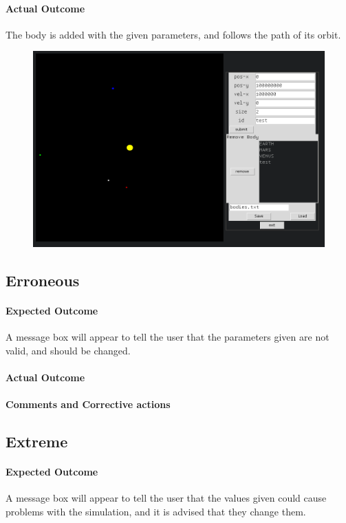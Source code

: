 \paragraph{Actual Outcome}
The body is added with the given parameters, and follows the path of its orbit.
\begin{figure}[H]
	\includegraphics[width=\textwidth]{./img/add1.png}
\end{figure}

\subsection{Erroneous}
\paragraph{Expected Outcome}
A message box will appear to tell the user that the parameters given are not
valid, and should be changed.
\paragraph{Actual Outcome}
\paragraph{Comments and Corrective actions}

\subsection{Extreme}
\paragraph{Expected Outcome}
A message box will appear to tell the user that the values given could cause
problems with the simulation, and it is advised that they change them.
